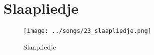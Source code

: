 \section{Slaapliedje}



\begin{figure}[!htbp]
  \texttt{[image: ../songs/23\_slaapliedje.png]}
  \caption{Slaapliedje}
  \label{fig:23_slaapliedje}
\end{figure}
